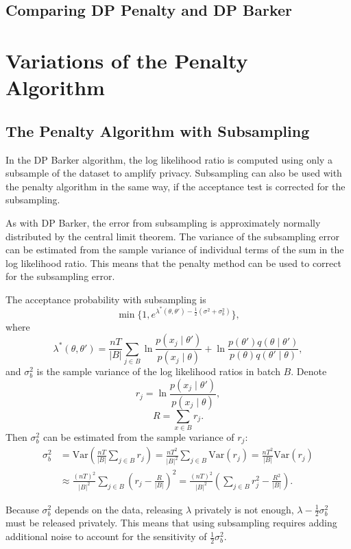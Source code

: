 \documentclass[english,twoside,openright]{HYgraduMLDS}
\newcommand{\var}{\mathrm{Var}}
\begin{document}
\section{Comparing DP Penalty and DP Barker}

\chapter{Variations of the Penalty Algorithm}

\section{The Penalty Algorithm with Subsampling}

In the DP Barker algorithm, the log likelihood ratio is computed using only 
a subsample of the dataset to amplify privacy. Subsampling can also be used 
with the penalty algorithm in the same way, if the acceptance test is 
corrected for the subsampling.

As with DP Barker, the error from subsampling is approximately normally 
distributed by the central limit theorem. The variance of the subsampling 
error can be estimated from the sample variance of individual terms of the 
sum in the log likelihood ratio. This means that the penalty method can be used 
to correct for the subsampling error.

The acceptance probability with subsampling is
\[
    \min\{1, e^{\lambda^*(\theta, \theta') - \frac{1}{2}(\sigma^2 + \sigma_b^2)}\},
\]
where
\[
    \lambda^*(\theta, \theta') = \frac{nT}{|B|}\sum_{j\in B}
    \ln \frac{p(x_j\mid \theta')}{p(x_j \mid \theta)}
    + \ln \frac{p(\theta')q(\theta \mid \theta')}{p(\theta)q(\theta' \mid \theta)},
\]
and \(\sigma_b^2\) is the sample variance of the log likelihood ratios in 
batch \(B\). Denote
\[
    r_j = \ln \frac{p(x_j\mid \theta')}{p(x_j\mid \theta)},
\]
\[
    R = \sum_{x\in B}r_j.
\]
Then \(\sigma^2_b\) can be estimated from the sample variance of \(r_j\):
\begin{align*}
    \sigma_b^2 
    &= \var\left(\frac{nT}{|B|}\sum_{j\in B}r_j\right)
    = \frac{nT^2}{|B|^2}\sum_{j\in B}\var(r_j)
    = \frac{nT^2}{|B|}\var(r_j)
  \\&\approx\frac{(nT)^2}{|B|^2}
    \sum_{j\in B}\left(r_j - \frac{R}{|B|}\right)^2
    = \frac{(nT)^2}{|B|^2}\left(\sum_{j\in B}r_j^2 - \frac{R^2}{|B|}\right).
\end{align*}

Because \(\sigma_b^2\) depends on the data, releasing \(\lambda\) privately is 
not enough, \(\lambda - \frac{1}{2}\sigma_b^2\) must be released privately.
This means that using subsampling requires adding additional noise to account 
for the sensitivity of \(\frac{1}{2}\sigma_b^2\).
\end{document}
